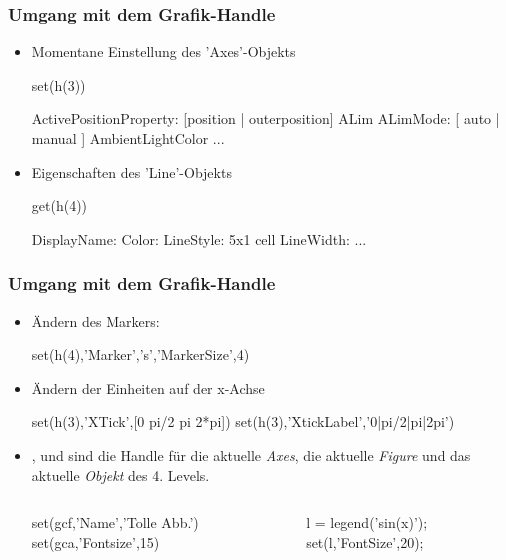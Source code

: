 \documentclass[hyperref={xetex}]{beamer}
\begin{document}
% 
%
\begin{frame}[fragile]\frametitle{Umgang mit dem Grafik-Handle }
\begin{itemize}
\item Momentane Einstellung des 'Axes'-Objekts
\begin{matlabin}
set(h(3))
\end{matlabin}
\begin{matlab}
        ActivePositionProperty: [position | {outerposition}]
        ALim
        ALimMode: [ {auto} | manual ]
        AmbientLightColor
               ... 
\end{matlab}
\item Eigenschaften des 'Line'-Objekts
\begin{matlabin}
get(h(4))
\end{matlabin}
\begin{matlab}
        DisplayName: {}
        Color: {}
        LineStyle: {5x1 cell}
        LineWidth: {}
               ... 
\end{matlab}
\end{itemize}
\end{frame}
% 
%
\begin{frame}[fragile]\frametitle{Umgang mit dem Grafik-Handle }
\begin{itemize}
\item \"Andern des Markers:
\begin{matlabin}
set(h(4),'Marker','s','MarkerSize',4)
\end{matlabin}
\item \"Andern der Einheiten auf der x-Achse
\begin{matlabin}
set(h(3),'XTick',[0 pi/2 pi 2*pi])
set(h(3),'XtickLabel','0|pi/2|pi|2pi')
\end{matlabin}
\item {},  und  sind die Handle f\"ur die
  aktuelle {\it Axes}, die aktuelle {\it Figure} und das aktuelle {\it
  Objekt} des 4. Levels.
\begin{columns}[t]
\begin{matlabin}
set(gcf,'Name','Tolle Abb.')
set(gca,'Fontsize',15) 
\end{matlabin}
\begin{matlabin}
l = legend('sin(x)');
set(l,'FontSize',20); 
\end{matlabin}
\end{columns}
\end{itemize}
\end{frame}
\end{document}
